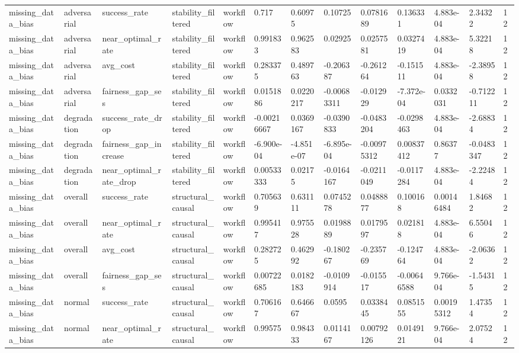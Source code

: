 \begin{tabular}{lllllllllllll}
missing\_data\_bias & adversarial & success\_rate & stability\_filtered & workflow & 0.717 & 0.60975 & 0.10725 & 0.0781689 & 0.136331 & 4.883e-04 & 2.34322 & 12 \\
missing\_data\_bias & adversarial & near\_optimal\_rate & stability\_filtered & workflow & 0.991833 & 0.962583 & 0.02925 & 0.0257581 & 0.0327419 & 4.883e-04 & 5.32218 & 12 \\
missing\_data\_bias & adversarial & avg\_cost & stability\_filtered & workflow & 0.283375 & 0.489763 & -0.206387 & -0.261264 & -0.151511 & 4.883e-04 & -2.38958 & 12 \\
missing\_data\_bias & adversarial & fairness\_gap\_ses & stability\_filtered & workflow & 0.0151886 & 0.0220217 & -0.00683311 & -0.012929 & -7.372e-04 & 0.0332031 & -0.712211 & 12 \\
missing\_data\_bias & degradation & success\_rate\_drop & stability\_filtered & workflow & -0.00216667 & 0.0369167 & -0.0390833 & -0.0483204 & -0.0298463 & 4.883e-04 & -2.68834 & 12 \\
missing\_data\_bias & degradation & fairness\_gap\_increase & stability\_filtered & workflow & -6.900e-04 & -4.851e-07 & -6.895e-04 & -0.00975312 & 0.00837412 & 0.86377 & -0.0483347 & 12 \\
missing\_data\_bias & degradation & near\_optimal\_rate\_drop & stability\_filtered & workflow & 0.00533333 & 0.02175 & -0.0164167 & -0.0211049 & -0.0117284 & 4.883e-04 & -2.22484 & 12 \\
missing\_data\_bias & overall & success\_rate & structural\_causal & workflow & 0.705639 & 0.631111 & 0.0745278 & 0.0488877 & 0.100168 & 0.00146484 & 1.84682 & 12 \\
missing\_data\_bias & overall & near\_optimal\_rate & structural\_causal & workflow & 0.995417 & 0.975528 & 0.0198889 & 0.0179597 & 0.021818 & 4.883e-04 & 6.55046 & 12 \\
missing\_data\_bias & overall & avg\_cost & structural\_causal & workflow & 0.282725 & 0.462992 & -0.180267 & -0.235769 & -0.124764 & 4.883e-04 & -2.06362 & 12 \\
missing\_data\_bias & overall & fairness\_gap\_ses & structural\_causal & workflow & 0.00722685 & 0.0182183 & -0.0109914 & -0.015517 & -0.00646588 & 9.766e-04 & -1.54315 & 12 \\
missing\_data\_bias & normal & success\_rate & structural\_causal & workflow & 0.706167 & 0.646667 & 0.0595 & 0.0338445 & 0.0851555 & 0.00195312 & 1.47354 & 12 \\
missing\_data\_bias & normal & near\_optimal\_rate & structural\_causal & workflow & 0.99575 & 0.984333 & 0.0114167 & 0.00792126 & 0.0149121 & 9.766e-04 & 2.07524 & 12 \\

\end{tabular}
